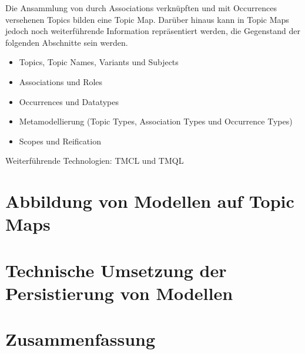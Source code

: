Die Ansammlung von durch Associations verknüpften und mit Occurrences versehenen Topics bilden eine Topic Map. Darüber hinaus kann in Topic Maps jedoch noch weiterführende Information repräsentiert werden, die Gegenstand der folgenden Abschnitte sein werden.

\begin{itemize}
 \item Topics, Topic Names, Variants und Subjects
 \item Associations und Roles
 \item Occurrences und Datatypes
 \item Metamodellierung (Topic Types, Association Types und Occurrence Types)
 \item Scopes und Reification
\end{itemize}

Weiterführende Technologien:
TMCL und TMQL

\section{Abbildung von Modellen auf Topic Maps} %
\label{sec:abbildung_von_modellen_auf_topic_maps}


\section{Technische Umsetzung der Persistierung von Modellen} %
\label{sec:technische_umsetzung_der_persistierung_von_modellen}


\section{Zusammenfassung} %
\label{sec:persistierung_zusammenfassung}

